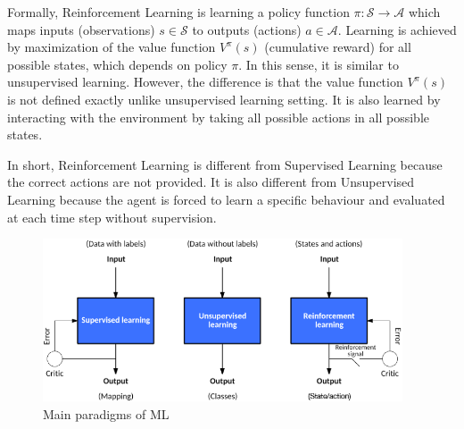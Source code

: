 Formally, Reinforcement Learning is learning a policy function 
$\pi \colon \mathcal{S} \rightarrow \mathcal{A}$ which maps 
inputs (observations) $s \in \mathcal{S}$ to outputs (actions) $a \in \mathcal{A}$. 
Learning is achieved by maximization of the value function $V^{\pi}(s)$ (cumulative reward) for all possible states, which depends on policy $\pi$. 
In this sense, it is similar to unsupervised learning. 
However, the difference is that the value function $V^{\pi}(s)$ is not defined exactly unlike unsupervised learning setting. 
It is also learned by interacting with the environment by taking all possible actions in all possible states. 

In short, Reinforcement Learning is different from Supervised Learning because the correct actions are not provided. 
It is also different from Unsupervised Learning because the agent is forced to learn a specific behaviour and evaluated at each time step without supervision. 

\begin{figure}
	\centering
	\includegraphics[width=0.95\textwidth]{figures/ml_theory/sl_ul_rl.png}
	\caption{Main paradigms of ML \cite{noauthor_models_nodate}}
	\label{fig:sl_ul_rl}
\end{figure}

